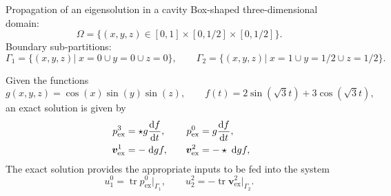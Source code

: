\documentclass[aspectratio=169]{beamer}
\DeclareMathOperator{\tr}{tr}
\begin{document}
\begin{frame}{Propagation of an eigensolution in a cavity}
	Box-shaped three-dimensional domain:
	$$\Omega = \{ (x,y,z) \in [0, 1]\times[0, 1/2]\times[0, 1/2] \}.$$ 
	Boundary sub-partitions:
	\begin{equation*}
		\Gamma_1 = \{(x,y,z) \vert \; x=0 \cup y=0 \cup z=0\}, \qquad \Gamma_2 = \{(x, y, z) \vert \; x=1 \cup y=1/2 \cup z=1/2 \}.
	\end{equation*}

Given the functions
\begin{equation*}
	g(x, y, z) = \cos(x) \sin(y) \sin(z), \qquad f(t) = 2 \sin(\sqrt{3} t) + 3 \cos(\sqrt{3} t),
\end{equation*}
an exact solution  is given by
\begin{equation*}\	\begin{aligned}
		p^3_{\mathrm{ex}} &= \star g \diff{f}{t}, \\    
		\bm{v}^1_{\mathrm{ex}} &= -\d{g} f, 
	\end{aligned} \qquad 
	\begin{aligned}
		p^0_{\mathrm{ex}} &= g \diff{f}{t}, \\
		\bm{v}^2_{\mathrm{ex}} &= -\star \d{g} f,
	\end{aligned}
\end{equation*}
The exact solution provides the appropriate inputs to be fed into the system
\begin{equation*}
	u^0_1 =\tr p^0_{\mathrm{ex}}|_{\Gamma_1}, \qquad u^2_2 =  -\tr \bm{v}^2_{\mathrm{ex}}\vert_{\Gamma_2}.
	\end{equation*}
\end{frame}
\end{document}
